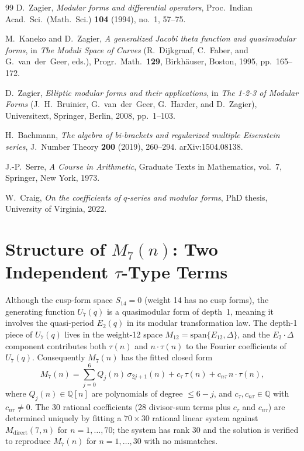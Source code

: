 \documentclass[11pt]{article}
\newcommand{\Q}{\mathbb{Q}}
\begin{document}
\begin{thebibliography}{99}
D.~Zagier,
\emph{Modular forms and differential operators},
Proc.\ Indian Acad.\ Sci.\ (Math.\ Sci.) \textbf{104} (1994), no.~1, 57--75.

M.~Kaneko and D.~Zagier,
\emph{A generalized Jacobi theta function and quasimodular forms},
in \textit{The Moduli Space of Curves}
  (R.~Dijkgraaf, C.~Faber, and G.~van~der~Geer, eds.),
Progr.\ Math.\ \textbf{129}, Birkh\"auser, Boston, 1995, pp.~165--172.

D.~Zagier,
\emph{Elliptic modular forms and their applications},
in \textit{The 1-2-3 of Modular Forms}
  (J.~H.~Bruinier, G.~van~der~Geer, G.~Harder, and D.~Zagier),
Universitext, Springer, Berlin, 2008, pp.~1--103.

H.~Bachmann,
\emph{The algebra of bi-brackets and regularized multiple Eisenstein series},
J.\ Number Theory \textbf{200} (2019), 260--294.
\newblock arXiv:1504.08138.

J.-P.~Serre,
\emph{A Course in Arithmetic},
Graduate Texts in Mathematics, vol.~7, Springer, New York, 1973.

W.~Craig,
\emph{On the coefficients of $q$-series and modular forms},
PhD thesis, University of Virginia, 2022.

\end{thebibliography}

\section{Structure of $M_7(n)$: Two Independent $\tau$-Type Terms}
\label{app:M7-formula}

Although the cusp-form space $S_{14}=0$ (weight 14 has no cusp forms), the generating
function $U_7(q)$ is a quasimodular form of depth~1, meaning it involves the
quasi-period $E_2(q)$ in its modular transformation law.
The depth-1 piece of $U_7(q)$ lives in the weight-12 space
$M_{12}=\mathrm{span}\{E_{12},\Delta\}$, and the $E_2\cdot\Delta$ component contributes
both $\tau(n)$ and $n\cdot\tau(n)$ to the Fourier coefficients of $U_7(q)$.
Consequently $M_7(n)$ has the fitted closed form
\begin{equation}
\label{eq:M7-formula}
M_7(n) = \sum_{j=0}^{6} Q_j(n)\,\sigma_{2j+1}(n)
          + c_\tau\,\tau(n)
          + c_{n\tau}\,n\cdot\tau(n),
\end{equation}
where $Q_j(n)\in\Q[n]$ are polynomials of degree $\le 6-j$, and $c_\tau,c_{n\tau}\in\Q$
with $c_{n\tau}\neq 0$.
The 30 rational coefficients (28 divisor-sum terms plus $c_\tau$ and $c_{n\tau}$)
are determined uniquely by fitting a $70\times 30$ rational linear system against
$M_{\mathrm{direct}}(7,n)$ for $n=1,\ldots,70$; the system has rank 30 and the solution
is verified to reproduce $M_7(n)$ for $n=1,\ldots,30$ with no mismatches.
\end{document}
